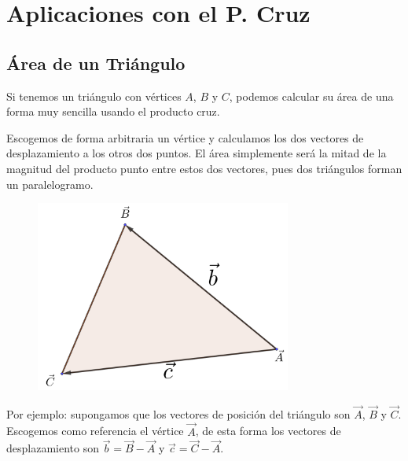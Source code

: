 \documentclass[12pt, fleqn]{report}                             %
\theoremstyle{break}                                            %
\begin{document}
        \clearpage
        \section{Aplicaciones con el P. Cruz}

            \subsection{Área de un Triángulo}
            
                Si tenemos un triángulo con vértices $A$, $B$ y $C$, podemos calcular su área de una forma muy
                sencilla usando el producto cruz.
                
                Escogemos de forma arbitraria un vértice y calculamos los dos vectores de desplazamiento a los
                otros dos puntos. El área simplemente será la mitad de la magnitud del producto punto entre
                estos dos vectores, pues dos triángulos forman un paralelogramo.

                \begin{figure}[H]
                    \centering
                    \includegraphics[width=0.75\textwidth]{triangle}
                \end{figure}
                
                Por ejemplo: supongamos que los vectores de posición del triángulo son $\vec{A}$, $\vec{B}$ y $\vec{C}$.
                Escogemos como referencia el vértice $\vec{A}$, de esta forma los vectores de desplazamiento son
                $\vec{b} = \vec{B}-\vec{A}$ y $\vec{c} = \vec{C}-\vec{A}$.
\end{document}
